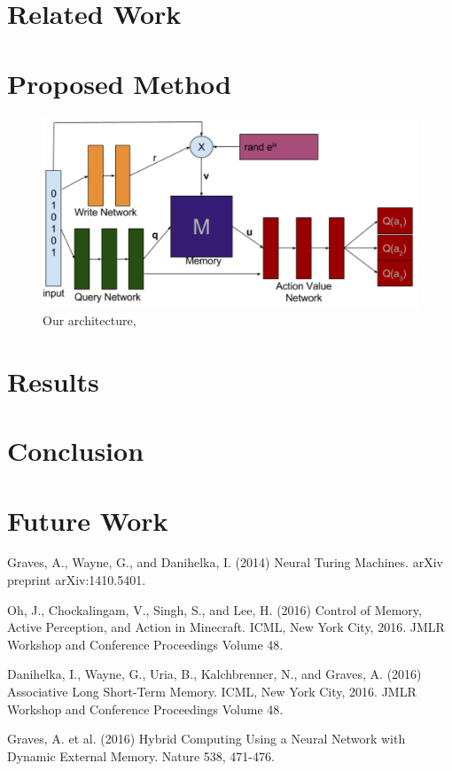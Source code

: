 \documentclass{article}
\begin{document}
\section*{Related Work}

\section*{Proposed Method}
\begin{figure}[!ht]
\includegraphics[width=1\textwidth]{images/architecture.png}
\caption{Our architecture, }
\label{fig:arch}
\end{figure}

\section*{Results}

\section*{Conclusion}

\section*{Future Work}


\begin{thebibliography}{plain}
Graves, A., Wayne, G., and Danihelka, I. (2014) Neural Turing Machines. arXiv preprint arXiv:1410.5401.

Oh, J., Chockalingam, V., Singh, S., and Lee, H. (2016) Control of Memory, Active Perception, and Action in Minecraft. ICML, New York City, 2016. JMLR Workshop and Conference Proceedings Volume 48.

Danihelka, I., Wayne, G., Uria, B., Kalchbrenner, N., and Graves, A. (2016) Associative Long Short-Term Memory. ICML, New York City, 2016. JMLR Workshop and Conference Proceedings Volume 48.

Graves, A. et al. (2016) Hybrid Computing Using a Neural Network with Dynamic External Memory. Nature 538, 471-476.
\end{thebibliography}
\end{document}
